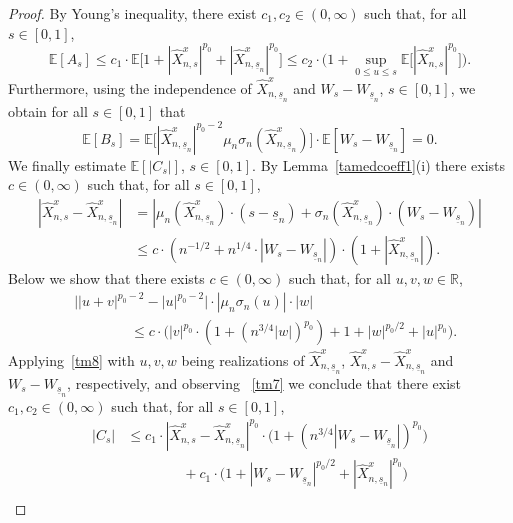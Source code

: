 \documentclass[11pt]{amsart}
\newcommand{\R}{{\mathbb R}}
\newcommand{\EE}{{\mathbb E}}
\newcommand{\usn}{\underline {s}_n}
\theoremstyle{plain}
\theoremstyle{definition}
\begin{document}
\begin{proof}
By Young's inequality, there exist $c_1, c_2\in (0,\infty)$ such that, for all $s\in[0,1]$,
\begin{equation}\label{tm5}
\EE[A_s] \le c_1\cdot \EE\bigl[ 1+|\widehat X^x_{n,s}|^{p_0} +|\widehat X^x_{n,\usn}|^{p_0}\bigr]\le c_2\cdot \bigl(1 + \sup_{0\le u\le s}\EE\bigl[|\widehat X^x_{n,s}|^{p_0}\bigr]\bigr).
\end{equation}
Furthermore,  using the independence of $\widehat X^x_{n,\usn}$ and $W_s-W_{\usn}$,  $s\in[0,1]$, we obtain
for all $s\in[0,1]$ that
\begin{equation}\label{tm6}
\EE[B_s] =  \EE\bigl[|\widehat X^x_{n,\usn}|^{p_0-2} \mu_n\sigma_n(\widehat X^x_{n,\usn})\bigr]\cdot\EE[W_s-W_{\usn}] = 0.
\end{equation}
We finally estimate $\EE[|C_s|]$, $s\in[0,1]$. By Lemma~\ref{tamedcoeff1}(i) there exists $c\in (0,\infty)$ such that, for all $s\in[0,1]$,
\begin{equation}\label{tm7}
\begin{aligned}
|\widehat X^x_{n,s}-\widehat X^x_{n,\usn}| & = |\mu_n(\widehat X^x_{n,\usn})\cdot(s-\usn) + \sigma_n(\widehat X^x_{n,\usn})\cdot(W_s-W_{\usn})|\\
& \le c\cdot(n^{-1/2} + n^{1/4}\cdot|W_s-W_{\usn}|)\cdot(1+|\widehat X^x_{n,\usn}|).
\end{aligned}
\end{equation}
Below we show that there exists $c\in (0,\infty)$ such that,  for all $u,v,w\in\R$,
\begin{equation}\label{tm8}
\begin{aligned}
& \bigl||u+v|^{p_0-2} - |u|^{p_0-2}\bigr|\cdot |\mu_n\sigma_n(u)|\cdot|w|\\
&\qquad\qquad\le c\cdot\bigl(|v|^{p_0}\cdot (1+(n^{3/4}|w|)^{p_0}
) + 1  +|w|^{p_0/2}+  |u|^{p_0}\bigr).
\end{aligned}
\end{equation}
Applying~\eqref{tm8} with $u, v, w$ being realizations of $\widehat X^x_{n,\usn}$, $\widehat X^x_{n,s}-\widehat X^x_{n,\usn}$ and $W_s - W_{\usn}$, respectively, and observing ~\eqref{tm7}
we conclude that there exist $c_1, c_2\in (0,\infty)$ such that, for all $s\in[0,1]$,
\begin{equation}\label{tm9}
\begin{aligned}
|C_s| & \le c_1\cdot|\widehat X^x_{n,s}-\widehat X^x_{n,\usn}|^{p_0}\cdot \bigl(1+(n^{3/4}|W_s-W_{\usn}|)^{p_0}
\bigr) \\
& \qquad\qquad + c_1\cdot\bigl(1 + |W_s-W_{\usn}|^{p_0/2}+|\widehat X^x_{n,\usn}|^{p_0}\bigr)\\

\end{aligned}
\end{equation}
\end{proof}
\end{document}
